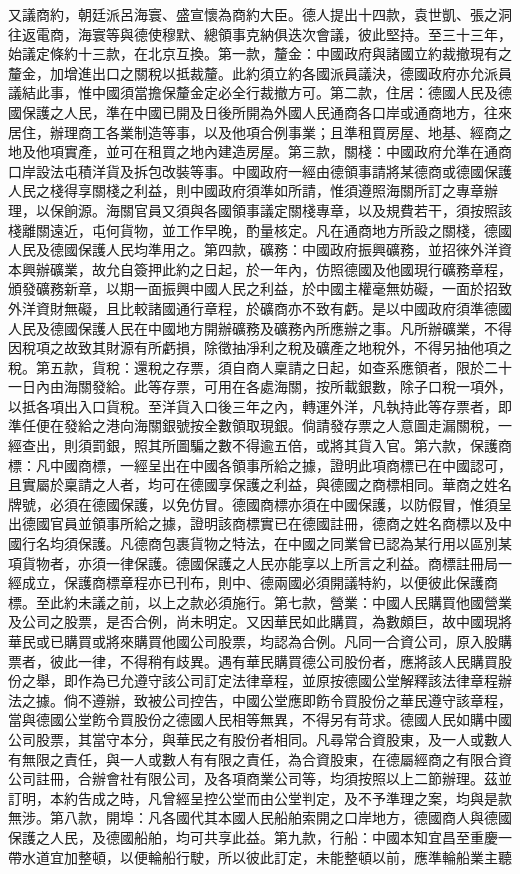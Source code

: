 \begin{pinyinscope}
又議商約，朝廷派呂海寰、盛宣懷為商約大臣。德人提出十四款，袁世凱、張之洞往返電商，海寰等與德使穆默、總領事克納俱迭次會議，彼此堅持。至三十三年，始議定條約十三款，在北京互換。第一款，釐金：中國政府與諸國立約裁撤現有之釐金，加增進出口之關稅以抵裁釐。此約須立約各國派員議決，德國政府亦允派員議結此事，惟中國須當擔保釐金定必全行裁撤方可。第二款，住居：德國人民及德國保護之人民，準在中國已開及日後所開為外國人民通商各口岸或通商地方，往來居住，辦理商工各業制造等事，以及他項合例事業；且準租買房屋、地基、經商之地及他項實產，並可在租買之地內建造房屋。第三款，關棧：中國政府允準在通商口岸設法屯積洋貨及拆包改裝等事。中國政府一經由德領事請將某德商或德國保護人民之棧得享關棧之利益，則中國政府須準如所請，惟須遵照海關所訂之專章辦理，以保餉源。海關官員又須與各國領事議定關棧專章，以及規費若干，須按照該棧離關遠近，屯何貨物，並工作早晚，酌量核定。凡在通商地方所設之關棧，德國人民及德國保護人民均準用之。第四款，礦務：中國政府振興礦務，並招徠外洋資本興辦礦業，故允自簽押此約之日起，於一年內，仿照德國及他國現行礦務章程，頒發礦務新章，以期一面振興中國人民之利益，於中國主權毫無妨礙，一面於招致外洋資財無礙，且比較諸國通行章程，於礦商亦不致有虧。是以中國政府須準德國人民及德國保護人民在中國地方開辦礦務及礦務內所應辦之事。凡所辦礦業，不得因稅項之故致其財源有所虧損，除徵抽凈利之稅及礦產之地稅外，不得另抽他項之稅。第五款，貨稅：還稅之存票，須自商人稟請之日起，如查系應領者，限於二十一日內由海關發給。此等存票，可用在各處海關，按所載銀數，除子口稅一項外，以抵各項出入口貨稅。至洋貨入口後三年之內，轉運外洋，凡執持此等存票者，即準任便在發給之港向海關銀號按全數領取現銀。倘請發存票之人意圖走漏關稅，一經查出，則須罰銀，照其所圖騙之數不得逾五倍，或將其貨入官。第六款，保護商標：凡中國商標，一經呈出在中國各領事所給之據，證明此項商標已在中國認可，且實屬於稟請之人者，均可在德國享保護之利益，與德國之商標相同。華商之姓名牌號，必須在德國保護，以免仿冒。德國商標亦須在中國保護，以防假冒，惟須呈出德國官員並領事所給之據，證明該商標實已在德國註冊，德商之姓名商標以及中國行名均須保護。凡德商包裹貨物之特法，在中國之同業曾已認為某行用以區別某項貨物者，亦須一律保護。德國保護之人民亦能享以上所言之利益。商標註冊局一經成立，保護商標章程亦已刊布，則中、德兩國必須開議特約，以便彼此保護商標。至此約未議之前，以上之款必須施行。第七款，營業：中國人民購買他國營業及公司之股票，是否合例，尚未明定。又因華民如此購買，為數頗巨，故中國現將華民或已購買或將來購買他國公司股票，均認為合例。凡同一合資公司，原入股購票者，彼此一律，不得稍有歧異。遇有華民購買德公司股份者，應將該人民購買股份之舉，即作為已允遵守該公司訂定法律章程，並原按德國公堂解釋該法律章程辦法之據。倘不遵辦，致被公司控告，中國公堂應即飭令買股份之華民遵守該章程，當與德國公堂飭令買股份之德國人民相等無異，不得另有苛求。德國人民如購中國公司股票，其當守本分，與華民之有股份者相同。凡尋常合資股東，及一人或數人有無限之責任，與一人或數人有有限之責任，為合資股東，在德屬經商之有限合資公司註冊，合辦會社有限公司，及各項商業公司等，均須按照以上二節辦理。茲並訂明，本約告成之時，凡曾經呈控公堂而由公堂判定，及不予準理之案，均與是款無涉。第八款，開埠：凡各國代其本國人民船舶索開之口岸地方，德國商人與德國保護之人民，及德國船舶，均可共享此益。第九款，行船：中國本知宜昌至重慶一帶水道宜加整頓，以便輪船行駛，所以彼此訂定，未能整頓以前，應準輪船業主聽
\end{pinyinscope}
